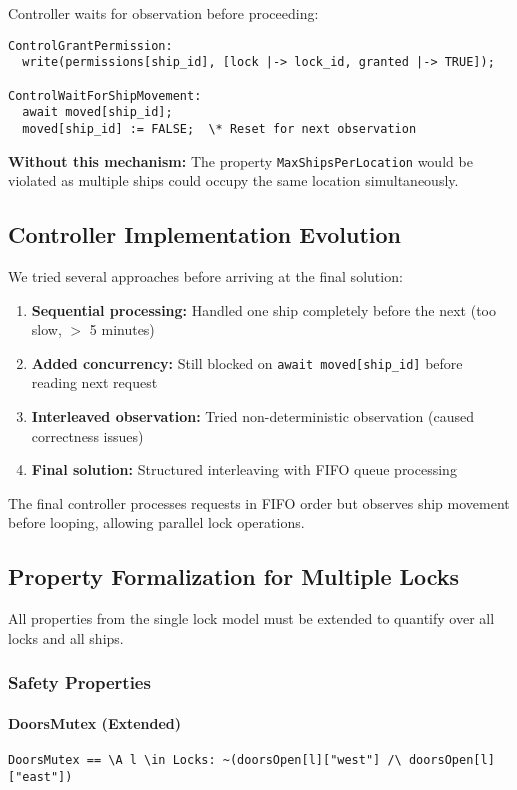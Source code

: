 \documentclass[12pt,a4paper]{article}
\begin{document}
Controller waits for observation before proceeding:
\begin{lstlisting}[style=tlaplus]
ControlGrantPermission:
  write(permissions[ship_id], [lock |-> lock_id, granted |-> TRUE]);

ControlWaitForShipMovement:
  await moved[ship_id];
  moved[ship_id] := FALSE;  \* Reset for next observation
\end{lstlisting}

\textbf{Without this mechanism:} The property \texttt{MaxShipsPerLocation} would be violated as multiple ships could occupy the same location simultaneously.

\subsection{Controller Implementation Evolution}

We tried several approaches before arriving at the final solution:

\begin{enumerate}
    \item \textbf{Sequential processing:} Handled one ship completely before the next (too slow, $>$ 5 minutes)
    \item \textbf{Added concurrency:} Still blocked on \texttt{await moved[ship\_id]} before reading next request
    \item \textbf{Interleaved observation:} Tried non-deterministic observation (caused correctness issues)
    \item \textbf{Final solution:} Structured interleaving with FIFO queue processing
\end{enumerate}

The final controller processes requests in FIFO order but observes ship movement before looping, allowing parallel lock operations.

\subsection{Property Formalization for Multiple Locks}

All properties from the single lock model must be extended to quantify over all locks and all ships.

\subsubsection{Safety Properties}

\paragraph{DoorsMutex (Extended)}
\begin{lstlisting}[style=tlaplus]
DoorsMutex == \A l \in Locks: ~(doorsOpen[l]["west"] /\ doorsOpen[l]["east"])
\end{lstlisting}
\end{document}
